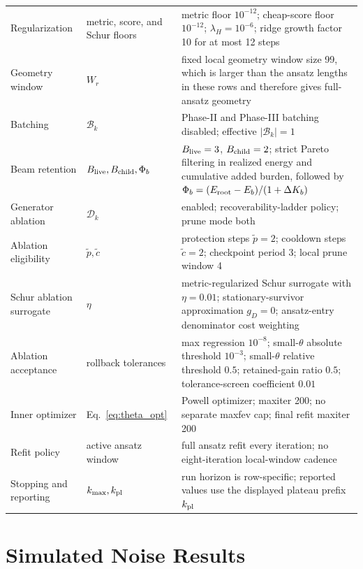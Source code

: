 \documentclass[
  reprint,
  amsmath,
  amssymb,
  aps,
  pra,
  nofootinbib,
  superscriptaddress,
  floatfix
]{revtex4-2}
\begin{document}
\begin{widetext}
{\begin{tabular}{@{}p{}p{}p{}@{}}
Regularization & metric, score, and Schur floors & metric floor \(10^{-12}\); cheap-score floor \(10^{-12}\); \(\lambda_H=10^{-6}\); ridge growth factor 10 for at most 12 steps \\
Geometry window & \(W_r\) & fixed local geometry window size 99, which is larger than the ansatz lengths in these rows and therefore gives full-ansatz geometry \\
Batching & \(\mathcal B_k\) & Phase-II and Phase-III batching disabled; effective \(|\mathcal B_k|=1\) \\
Beam retention & \(B_{\rm live},B_{\rm child},\Phi_b\) & \(B_{\rm live}=3\), \(B_{\rm child}=2\); strict Pareto filtering in realized energy and cumulative added burden, followed by \(\Phi_b=(E_{\rm root}-E_b)/(1+\Delta K_b)\) \\
Generator ablation & \(\mathcal D_k\) & enabled; recoverability-ladder policy; prune mode both \\
Ablation eligibility & \(\tilde p,\tilde c\) & protection steps \(\tilde p=2\); cooldown steps \(\tilde c=2\); checkpoint period 3; local prune window 4 \\
Schur ablation surrogate & \(\eta\) & metric-regularized Schur surrogate with \(\eta=0.01\); stationary-survivor approximation \(g_D=0\); ansatz-entry denominator cost weighting \\
Ablation acceptance & rollback tolerances & max regression \(10^{-8}\); small-\(\theta\) absolute threshold \(10^{-3}\); small-\(\theta\) relative threshold \(0.5\); retained-gain ratio \(0.5\); tolerance-screen coefficient \(0.01\) \\
Inner optimizer & Eq.~\eqref{eq:theta_opt} & Powell optimizer; maxiter 200; no separate maxfev cap; final refit maxiter 200 \\
Refit policy & active ansatz window & full ansatz refit every iteration; no eight-iteration local-window cadence \\
Stopping and reporting & \(k_{\max},k_{\rm pl}\) & run horizon is row-specific; reported values use the displayed plateau prefix \(k_{\rm pl}\) \\
\bottomrule
\end{tabular}%
}
\end{widetext}

\section{Simulated Noise Results}
\label{app:noise_selection_robustness}
\label{app:finite_shot_score_robustness}
\end{document}
